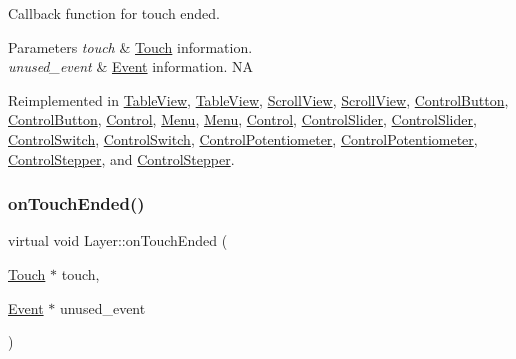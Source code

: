 Callback function for touch ended.


\begin{DoxyParams}{Parameters}
{\em touch} & \hyperlink{classTouch}{Touch} information. \\
\hline
{\em unused\+\_\+event} & \hyperlink{classEvent}{Event} information.  NA \\
\hline
\end{DoxyParams}


Reimplemented in \hyperlink{classTableView_a0d96aaf8ac40256ed144565beaaf76aa}{Table\+View}, \hyperlink{classTableView_a361d91c5c592b3d81ed43b6743487fc3}{Table\+View}, \hyperlink{classScrollView_aafc1076e1f21bc66749a4c814814d681}{Scroll\+View}, \hyperlink{classScrollView_a86f57715da926a475b75d67eff84701d}{Scroll\+View}, \hyperlink{classControlButton_a7597744c683964152429472a358b3fd2}{Control\+Button}, \hyperlink{classControlButton_a6f562dc0b399591189883ea7788603d7}{Control\+Button}, \hyperlink{classControl_af31a373d40a3181e2a97f0f9dc85c1f8}{Control}, \hyperlink{classMenu_ab8d24a11ed99eead18acd6376a0a3d76}{Menu}, \hyperlink{classMenu_a8d9a867ea2dfc4ec2a3309f3df71cc35}{Menu}, \hyperlink{classControl_a56073e57060169fe80cbb6ce1f4abe28}{Control}, \hyperlink{classControlSlider_a9ba0559605c93e08dc4548261cbc2773}{Control\+Slider}, \hyperlink{classControlSlider_acdda8fa6365ab06db757c0a525c5108e}{Control\+Slider}, \hyperlink{classControlSwitch_a6976aba81f0846eb827114efc06301d3}{Control\+Switch}, \hyperlink{classControlSwitch_a13db70a616ea0e992710fc8041792f66}{Control\+Switch}, \hyperlink{classControlPotentiometer_adb487a04c463b3cfbf63be0957cee24c}{Control\+Potentiometer}, \hyperlink{classControlPotentiometer_adfd4029e5b390ba94a0ba0373adbc5d9}{Control\+Potentiometer}, \hyperlink{classControlStepper_a7934349dae09881fce7a72d4985d0154}{Control\+Stepper}, and \hyperlink{classControlStepper_a55e6582294a0520d21e397c3a58cf57b}{Control\+Stepper}.

\mbox{\label{classLayer_a953c3166b987743f281b03c003a98859}} 
\subsubsection{\texorpdfstring{on\+Touch\+Ended()}{onTouchEnded()}\hspace{0.1cm}{\footnotesize\ttfamily [2/2]}}
{\footnotesize\ttfamily virtual void Layer\+::on\+Touch\+Ended (\begin{DoxyParamCaption}\item[{\hyperlink{classTouch}{Touch} $\ast$}]{touch,  }\item[{\hyperlink{classEvent}{Event} $\ast$}]{unused\+\_\+event }\end{DoxyParamCaption})\hspace{0.3cm}{\ttfamily [virtual]}}

